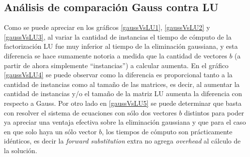 \subsection{Análisis de comparación Gauss contra LU}
Como se puede apreciar en los gráficos \ref{gaussVsLU1}, \ref{gaussVsLU2} y \ref{gaussVsLU3}, al
variar la cantidad de instancias el tiempo de cómputo de la factorización LU fue muy inferior al
tiempo de la eliminación gaussiana, y esta diferencia se hace sumamente notoria a medida que la
cantidad de vectores $b$ (a partir de ahora simplemente ``instancias'') a calcular aumenta. En el gráfico 
\ref{gaussVsLU4} se puede observar como la diferencia es proporcional tanto a la cantidad de instancias como al 
tamaño de las matrices, es decir, al aumentar la cantidad de instancias y/o el tamaño de la matriz LU aumenta 
la diferencia con respecto a Gauss. Por otro lado en \ref{gaussVsLU5} se puede determinar que basta con resolver el 
sistema de ecuaciones con sólo dos vectores $b$ distintos para poder ya apreciar una ventaja efectiva sobre la eliminación gaussiana 
y que para el caso en que solo haya un sólo vector $b$, los tiempos de cómputo son prácticamente idénticos, es decir la 
\emph{forward substitution} extra no agrega \emph{overhead} al cálculo de la solución.
